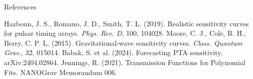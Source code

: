 \documentclass{beamer}
\begin{document}
\begin{frame}{References}
    \begin{thebibliography}{1}
         Hazboun, J. S., Romano, J. D., Smith, T. L. (2019). Realistic sensitivity curves for pulsar timing arrays. \textit{Phys. Rev. D}, 100, 104028.
         Moore, C. J., Cole, R. H., Berry, C. P. L. (2015). Gravitational-wave sensitivity curves. \textit{Class. Quantum Grav.}, 32, 015014.
         Babak, S. et al. (2024). Forecasting PTA sensitivity. arXiv:2404.02864.
         Jennings, R. (2021). Transmission Functions for Polynomial Fits. NANOGrav Memorandum 006.
    \end{thebibliography}
\end{frame}
\end{document}
